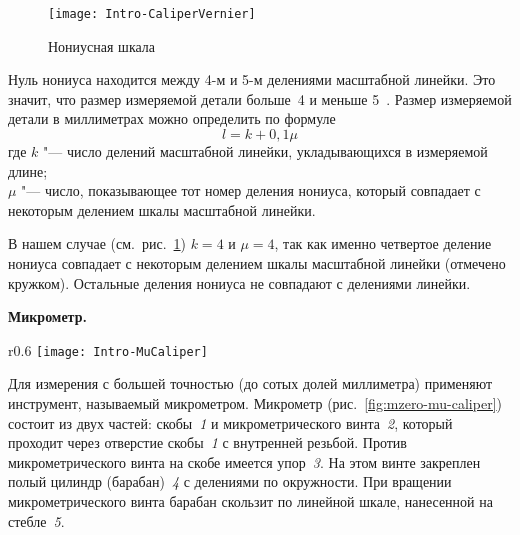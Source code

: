 \documentclass[a4paper, 12pt]{extarticle}
\begin{document}
\begin{figure}[h]
 \begin{center}
  \texttt{[image: Intro-CaliperVernier]}
  \caption{Нониусная шкала \label{fig:mzero-vernier-scale}}
 \end{center}
\end{figure}


Нуль нониуса находится между 4-м и 5-м делениями масштабной линейки. Это значит, что размер измеряемой детали больше~4 и меньше 5~. Размер измеряемой детали в миллиметрах можно определить по формуле
\begin{equation}
\label{eq:how-do-i-caliper}
l = k + 0,1\mu
\end{equation}
где $k$ "--- число делений масштабной линейки, укладывающихся в измеряемой длине; \\
$\mu$ "--- число, показывающее тот номер деления нониуса, который совпадает  с некоторым делением шкалы масштабной линейки.

В нашем случае (см.~рис.~\ref{fig:mzero-vernier-scale}) $k = 4$ и $\mu = 4$, так как именно четвертое деление нониуса совпадает с некоторым делением шкалы масштабной линейки (отмечено кружком). Остальные деления нониуса не совпадают с делениями линейки.





\textbf{Микрометр.}

\begin{wrapfigure}{r}{0.6\textwidth}
 \centering
  \texttt{[image: Intro-MuCaliper]}
 \caption{Микрометр \label{fig:mzero-mu-caliper}}
\end{wrapfigure}

Для измерения с большей точностью (до сотых долей миллиметра) применяют инструмент, называемый микрометром. Микрометр (рис.~\ref{fig:mzero-mu-caliper}) состоит из двух частей: скобы~\emph{1} и микрометрического винта~\emph{2}, который проходит через отверстие скобы~\emph{1} с внутренней резьбой. Против микрометрического винта на скобе имеется упор~\emph{3}. На этом винте закреплен полый цилиндр (барабан)~\emph{4} с делениями по окружности. При вращении микрометрического винта барабан скользит по линейной шкале, нанесенной на стебле~\emph{5}.
\end{document}
